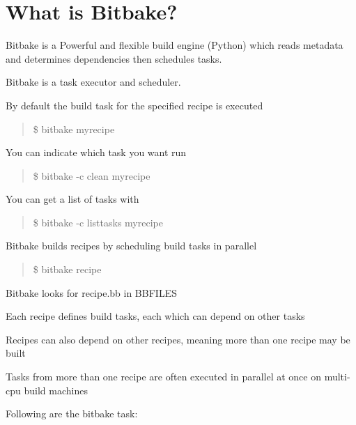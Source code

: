 \section*{What is Bitbake?}


\begin{DoxyItemize}
\item Bitbake is a Powerful and flexible build engine (Python) which reads metadata and determines dependencies then schedules tasks.
\item Bitbake is a task executor and scheduler. 
\item By default the build task for the specified recipe is executed \begin{quote}
\$ bitbake myrecipe \end{quote}

\item You can indicate which task you want run \begin{quote}
\$ bitbake -\/c clean myrecipe \end{quote}

\item You can get a list of tasks with \begin{quote}
\$ bitbake -\/c listtasks myrecipe \end{quote}

\item Bitbake builds recipes by scheduling build tasks in parallel \begin{quote}
\$ bitbake recipe \end{quote}

\item Bitbake looks for recipe.\+bb in B\+B\+F\+I\+L\+ES
\item Each recipe defines build tasks, each which can depend on other tasks
\item Recipes can also depend on other recipes, meaning more than one recipe may be built
\item Tasks from more than one recipe are often executed in parallel at once on multi-\/cpu build machines
\item Following are the bitbake task\+:
\end{DoxyItemize}

